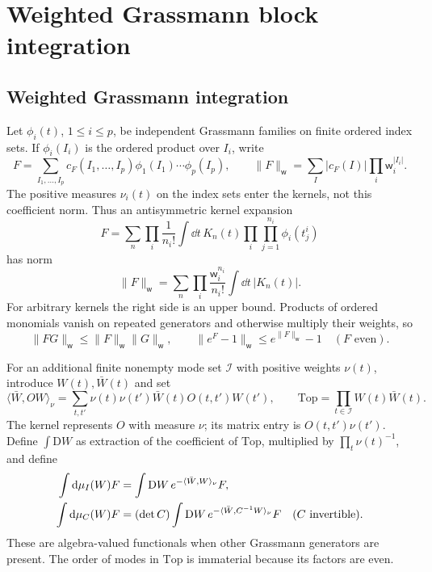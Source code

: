 \section{Weighted Grassmann block integration}\label{sec:weighted-integration}

\subsection{Weighted Grassmann integration}\label{subsec:weighted-grassmann}

Let $\phi_i(t)$, $1\le i\le p$, be independent Grassmann families
on finite ordered index sets. If $\phi_i(I_i)$ is the ordered product
over $I_i$, write
\[
 F=\sum_{I_1,\ldots,I_p}c_F(I_1,\ldots,I_p)
                 \phi_1(I_1)\cdots\phi_p(I_p),\qquad
 \|F\|_{\mathsf w}=\sum_I|c_F(I)|\prod_i\mathsf w_i^{|I_i|}.
\]
The positive measures $\nu_i(t)$ on the index sets enter the kernels,
not this coefficient norm. Thus an antisymmetric kernel expansion
\[
 F=\sum_n\prod_i\frac1{n_i!}\int\dd t\,K_n(t)
                       \prod_i\prod_{j=1}^{n_i}\phi_i(t_j^i)
\]
has norm
\begin{equation}\label{eq:grassmann-kernel-norm}
 \|F\|_{\mathsf w}
     =\sum_n\prod_i\frac{\mathsf w_i^{n_i}}{n_i!}
                      \int\dd t\,|K_n(t)|.
\end{equation}
For arbitrary kernels the right side is an upper bound. Products of
ordered monomials vanish on repeated generators and otherwise multiply
their weights, so
\begin{equation}\label{eq:grassmann-product-bound}
 \|FG\|_{\mathsf w}\le\|F\|_{\mathsf w}\|G\|_{\mathsf w},
 \qquad \|e^F-1\|_{\mathsf w}\le e^{\|F\|_{\mathsf w}}-1
       \quad(F\text{ even}).
\end{equation}

For an additional finite nonempty mode set $\mathcal I$ with positive weights
$\nu(t)$, introduce $W(t),\bar W(t)$ and set
\[
 \langle\bar W,OW\rangle_\nu
    =\sum_{t,t'}\nu(t)\nu(t')\bar W(t)O(t,t')W(t'),
 \qquad \mathrm{Top}=\prod_{t\in\mathcal I}W(t)\bar W(t).
\]
The kernel represents $O$ with measure $\nu$; its matrix entry is
$O(t,t')\nu(t')$. Define $\int\mathrm DW$ as extraction of the
coefficient of $\mathrm{Top}$, multiplied by
$\prod_t\nu(t)^{-1}$, and define
\begin{align}
 \int\mathrm d\mu_I(W)F
     &=\int\mathrm DW\,e^{-\langle\bar W,W\rangle_\nu}F,
                                            \label{eq:weighted-Berezin}\\
 \int\mathrm d\mu_C(W)F
     &=(\det C)\int\mathrm DW\,
               e^{-\langle\bar W,C^{-1}W\rangle_\nu}F
                    \quad(C\text{ invertible}).\notag
\end{align}
These are algebra-valued functionals when other Grassmann generators
are present. The order of modes in $\mathrm{Top}$ is immaterial because
its factors are even.

